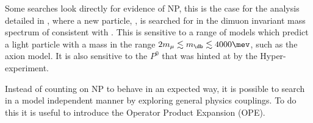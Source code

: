 Some searches look directly for evidence of NP, this is the case for the analysis detailed in
, where a new particle, \db, is searched for in the dimuon invariant mass spectrum of
\decay{\Bd}{\Kstarent\mumu} consistent with \decay{\db}{\mumu}.
This is sensitive to a range of models which predict a light particle with a mass in the range
$2m_\mu\lesssim m_\db\lesssim4000\mev$, such as the axion model.
It is also sensitive to the $P^0$ that was hinted at by the Hyper-\CP experiment.

Instead of counting on NP to behave in an expected way, it is possible to search in a model
independent manner by exploring general physics couplings.
To do this it is useful to introduce the Operator Product Expansion (OPE).


